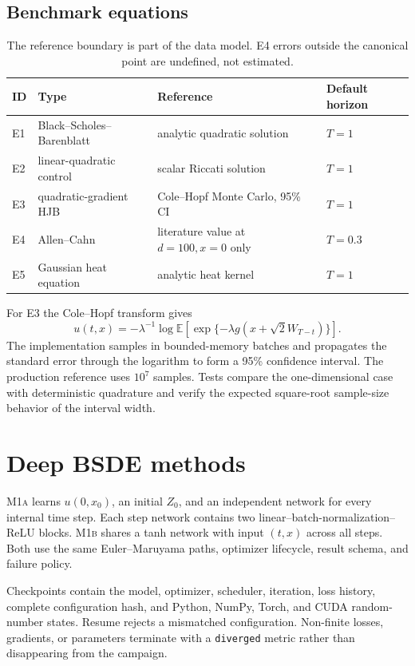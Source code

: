 \documentclass[11pt]{article}
\newcommand{\method}[1]{\textsc{#1}}
\begin{document}
\subsection{Benchmark equations}
\begin{table}[ht]
\centering
\small
\begin{tabular}{llll}
\toprule
ID & Type & Reference & Default horizon \\
\midrule
E1 & Black--Scholes--Barenblatt & analytic quadratic solution & $T=1$ \\
E2 & linear-quadratic control & scalar Riccati solution & $T=1$ \\
E3 & quadratic-gradient HJB & Cole--Hopf Monte Carlo, 95\% CI & $T=1$ \\
E4 & Allen--Cahn & literature value at $d=100,x=0$ only & $T=0.3$ \\
E5 & Gaussian heat equation & analytic heat kernel & $T=1$ \\
\bottomrule
\end{tabular}
\caption{The reference boundary is part of the data model. E4 errors outside the canonical
point are undefined, not estimated.}
\end{table}

For E3 the Cole--Hopf transform gives
\begin{equation}
 u(t,x)=-\lambda^{-1}\log\mathbb{E}\left[
 \exp\{-\lambda g(x+\sqrt{2}W_{T-t})\}\right].
\end{equation}
The implementation samples in bounded-memory batches and propagates the standard error
through the logarithm to form a 95\% confidence interval. The production reference uses
$10^7$ samples. Tests compare the one-dimensional case with deterministic quadrature and
verify the expected square-root sample-size behavior of the interval width.

\section{Deep BSDE methods}
\method{M1a} learns $u(0,x_0)$, an initial $Z_0$, and an independent network for every
internal time step. Each step network contains two linear--batch-normalization--ReLU blocks.
\method{M1b} shares a tanh network with input $(t,x)$ across all steps. Both use the same
Euler--Maruyama paths, optimizer lifecycle, result schema, and failure policy.

Checkpoints contain the model, optimizer, scheduler, iteration, loss history, complete
configuration hash, and Python, NumPy, Torch, and CUDA random-number states. Resume rejects
a mismatched configuration. Non-finite losses, gradients, or parameters terminate with a
\texttt{diverged} metric rather than disappearing from the campaign.
\end{document}
